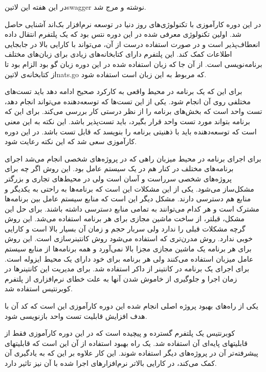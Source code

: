 \documentclass[a4]{report}
\begin{document}
در این هفته این ‌لاتین{swagger} نوشته و مرج شد.

در این دوره کارآموزی با تکنولوژی‌های روز دنیا در توسعه نرم‌افزار بک‌اند آشنایی حاصل شد. اولین تکنولوژی
معرفی شده در این دوره نتس بود که یک پلتفرم انتقال داده انعطاف‌پذیر است و در صورت استفاده درست
از آن، می‌تواند با کارایی بالا در جابجایی اطلاعات کمک کند. این پلتفرم دارای کتابخانه‌های زیادی برای زبان‌های
مختلف برنامه‌نویسی است. از آن جا که زبان استفاده شده در این دوره زبان گو بود الزام بود تا از کتابخانه‌ی ‌لاتین{nats.go}
که مربوط به این زبان است استفاده شود.

برای این که یک برنامه در محیط واقعی به کارکرد صحیح ادامه دهد باید تست‌های مختلفی روی آن انجام شود. یکی از این تست‌ها که توسعه‌دهنده می‌تواند انجام دهد، تست واحد است که بخش‌های برنامه را از نظر درستی کار بررسی می‌کند.
برای این که برنامه بتواند مورد تست واحد قرار بگیرد، باید تست‌پذیر باشد. این نکته به این معنی است که توسعه‌دهنده باید با ذهنیتی برنامه را بنویسد که قابل تست باشد.
در این دوره کارآموزی سعی شد که این نکته رعایت شود.

برای اجرای برنامه در محیط میزبان راهی که در پروژه‌های شخصی انجام می‌شد اجرای برنامه‌های مختلف در
کنار هم در یک سیستم عامل بود. این روش اگر چه برای پروژه‌های شخصی سرراست و آسان است ولی در
محیط‌های تجاری و بزرگتر مشکل‌ساز می‌شود. یکی از این مشکلات این است که برنامه‌ها به راحتی به یکدیگر و
منابع هم دسترسی دارند. مشکل دیگر این است که منابع سیستم عامل بین برنامه‌ها مشترک است و هر
کدام می‌توانند به تمامی منابع دسترسی داشته باشند. برای حل این مشکل، قبلتر، از ساخت ماشین مجازی برای
هر برنامه استفاده می‌شد. این روش گرچه مشکلات قبلی را ندارد ولی سربار حجم و زمان آن بسیار بالا است و
کارایی خوبی ندارد. روش مدرن‌تری که استفاده می‌شود روش کانتینرسازی است. این روش برای هر برنامه یک
ماشین مجازی مجزا بالا نمی‌آورد و همه برنامه‌ها از منابع سیستم عامل میزبان استفاده می‌کنند ولی هر برنامه
برای خود دارای یک محیط ایزوله است. برای اجرای یک برنامه در کانتینر از داکر استفاده شد. برای مدیریت این
کانتینرها در زمان اجرا و جلوگیری از خاموش شدن آنها به علت خطای نرم‌افزاری از پلتفرم کوبرنتیس استفاده
شد.

یکی از راه‌های بهبود پروژه اصلی انجام شده این دوره کارآموزی این است که کد آن با هدف افزایش قابلیت
تست واحد بازنویسی شود.

کوبرنتیس یک پلتفرم گسترده و پیچیده است که در این دوره کارآموزی فقط از قابلیتهای پایه‌ای آن استفاده
شد. یک راه بهبود استفاده از آن این است که قابلیتهای پیشرفته‌تر آن در پروژه‌های دیگر استفاده شوند. این کار
علاوه بر این که به یادگیری آن کمک می‌کند، در کارایی بالاتر نرم‌افزارهای اجرا شده با آن نیز تاثیر دارد.



\end{document}
